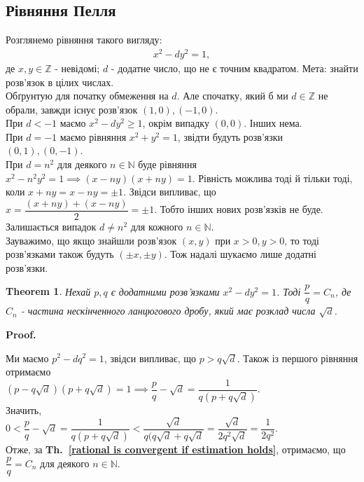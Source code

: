 \documentclass[a4paper, 10pt]{article}
\makeatletter
\theoremstyle{theoremdd}
\newtheorem{theorem}{Theorem}[subsection]
\theoremstyle{theoremdd}
\theoremstyle{theoremdd}
\theoremstyle{theoremdd}
\theoremstyle{theoremdd}
\theoremstyle{theoremdd}
\theoremstyle{theoremdd}
\theoremstyle{theoremdd}
\renewenvironment{proof}[1][Proof.\\]{\par
\pushQED{\hfill \qed}%
\normalfont \topsep6\p@\@plus6\p@\relax
\trivlist
\item\relax
{\bfseries
#1\@addpunct{.}}\hspace\labelsep\ignorespaces
}{%
\popQED\endtrivlist\@endpefalse
}
\newcommand\thref[1]{\textbf{Th.~\ref{#1}}}
\makeatother
\begin{document}
\subsection{Рівняння Пелля}
Розглянемо рівняння такого вигляду:
\begin{align*}
x^2 - dy^2 = 1,
\end{align*}
де $x,y \in \mathbb{Z}$ - невідомі; $d$ - додатне число, що не є точним квадратом. Мета: знайти розв'язок в цілих числах.
\bigskip \\
Обґрунтую для початку обмеження на $d$. Але спочатку, який б ми $d \in \mathbb{Z}$ не обрали, завжди існує розв'язок $(1,0), (-1,0)$.\\
При $d < -1$ маємо $x^2 -dy^2 \geq 1$, окрім випадку $(0,0)$. Інших нема.\\
При $d = -1$ маємо рівняння $x^2 + y^2 = 1$, звідти будуть розв'язки $(0,1), (0,-1)$.\\
При $d = n^2$ для деякого $n \in \mathbb{N}$ буде рівняння $x^2 - n^2y^2 = 1 \implies (x-ny)(x+ny) = 1$. Рівність можлива тоді й тільки тоді, коли $x + ny = x - ny = \pm 1$. Звідси випливає, що $x = \dfrac{(x+ny)+(x-ny)}{2} = \pm 1$. Тобто інших нових розв'язків не буде.\\
Залишається випадок $d \neq n^2$ для кожного $n \in \mathbb{N}$.
\bigskip \\
Зауважимо, що якщо знайшли розв'язок $(x,y)$ при $x > 0, y > 0$, то тоді розв'язками також будуть $(\pm x, \pm y)$. Тож надалі шукаємо лише додатні розв'язки.

\begin{theorem}
Нехай $p,q$ є додатними розв'язками $x^2-dy^2 = 1$. Тоді $\dfrac{p}{q} = C_n$, де $C_n$ - частина нескінченного ланцюгового дробу, який має розклад числа $\sqrt{d}$.
\end{theorem}

\begin{proof}
Ми маємо $p^2 - dq^2 = 1$, звідси випливає, що $p > q \sqrt{d}$. Також із першого рівняння отримаємо\\ $(p-q \sqrt{d}) (p+q \sqrt{d}) = 1 \iffalse \implies p-q \sqrt{d} = \dfrac{1}{p + q\sqrt{d}} \fi \implies \dfrac{p}{q} - \sqrt{d} = \dfrac{1}{q(p+q\sqrt{d})}$.\\
Значить, \\
$0 < \dfrac{p}{q} - \sqrt{d} = \dfrac{1}{q(p + q \sqrt{d})} < \dfrac{\sqrt{d}}{q(q\sqrt{d} + q\sqrt{d}} = \dfrac{\sqrt{d}}{2q^2 \sqrt{d}} = \dfrac{1}{2q^2}$.\\
Отже, за \thref{rational is convergent if estimation holds}, отримаємо, що $\dfrac{p}{q} = C_n$ для деякого $n \in \mathbb{N}$.
\end{proof}
\end{document}
